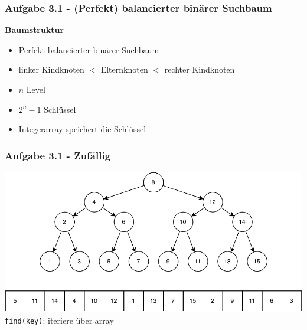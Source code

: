 \documentclass[aspectratio=169]{beamer}
\begin{document}
\begin{frame}
\begin{columns}[c]
		
	\end{columns}
	\end{frame}
	

\begin{frame}
	\frametitle{Aufgabe 3.1 - (Perfekt) balancierter binärer Suchbaum}
	
	\textbf{Baumstruktur}
	\begin{itemize}
		\item Perfekt balancierter binärer Suchbaum
		\item linker Kindknoten $<$ Elternknoten $<$ rechter Kindknoten
		\item $n$ Level
		\item $2^{n}-1$ Schlüssel
		\item Integerarray speichert die Schlüssel
	\end{itemize}

	\end{frame}

\begin{frame}
	\frametitle{Aufgabe 3.1 - Zufällig}
	
	\begin{center}
		\includegraphics[scale=.8]{random_layout.pdf}\\
		\centering \texttt{find(key)}: iteriere über array
	\end{center}

	\end{frame}
\end{document}
